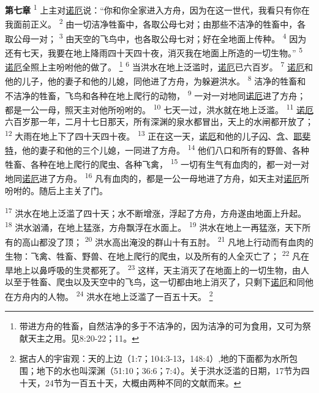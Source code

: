 \textbf{第七章\quad}
\textsuperscript{1}
上主对\uline{诺厄}说：“你和你全家进入方舟，因为在这一世代，我看只有你在我面前正义。
\textsuperscript{2}
由一切洁净牲畜中，各取公母七对；由那些不洁净的牲畜中，各取公母一对；
\textsuperscript{3}
由天空的飞鸟中，也各取公母七对；好在全地面上传种。
\textsuperscript{4}
因为还有七天，我要在地上降雨四十天四十夜，消灭我在地面上所造的一切生物。”
\textsuperscript{5}
\uline{诺厄}全照上主吩咐他的做了。
\footnote{带进方舟的牲畜，自然洁净的多于不洁净的，因为洁净的可为食用，又可为祭献天主之用。见8:20-22；11。}
\textsuperscript{6}
当洪水在地上泛滥时，\uline{诺厄}已六百岁。
\textsuperscript{7}
\uline{诺厄}和他的儿子，他的妻子和他的儿媳，同他进了方舟，为躲避洪水。
\textsuperscript{8}
洁净的牲畜和不洁净的牲畜，飞鸟和各种在地上爬行的动物，
\textsuperscript{9}
一对一对地同\uline{诺厄}进了方舟；都是一公一母，照天主对他所吩咐的。
\textsuperscript{10}
七天一过，洪水就在地上泛滥。
\textsuperscript{11}
\uline{诺厄}六百岁那一年，二月十七日那天，所有深渊的泉水都冒出，天上的水闸都开放了；
\textsuperscript{12}
大雨在地上下了四十天四十夜。
\textsuperscript{13}
正在这一天，\uline{诺厄}和他的儿子\uline{闪}、\uline{含}、\uline{耶斐特}，他的妻子和他的三个儿媳，一同进了方舟。
\textsuperscript{14}
他们八口和所有的野兽、各种牲畜、各种在地上爬行的爬虫、各种飞禽，
\textsuperscript{15}
一切有生气有血肉的，都一对一对地同\uline{诺厄}进了方舟。
\textsuperscript{16}
凡有血肉的，都是一公一母地进了方舟，如天主对\uline{诺厄}所吩咐的。随后上主关了门。

\textsuperscript{17}
洪水在地上泛滥了四十天；水不断增涨，浮起了方舟，方舟遂由地面上升起。
\textsuperscript{18}
洪水汹涌，在地上猛涨，方舟飘浮在水面上。
\textsuperscript{19}
洪水在地上一再猛涨，天下所有的高山都没了顶；
\textsuperscript{20}
洪水高出淹没的群山十有五肘。
\textsuperscript{21}
凡地上行动而有血肉的生物：飞禽、牲畜、野兽、在地上爬行的爬虫，以及所有的人全灭亡了；
\textsuperscript{22}
凡在旱地上以鼻呼吸的生灵都死了。
\textsuperscript{23}
这样，天主消灭了在地面上的一切生物，由人以至于牲畜、爬虫以及天空中的飞鸟，这一切都由地上消灭了，只剩下\uline{诺厄}和同他在方舟内的人物。
\textsuperscript{24}
洪水在地上泛滥了一百五十天。
\footnote{据古人的宇宙观：天的上边（1:7；104:3-13，148:4）,地的下面都为水所包围；地下的水也叫深渊（51:10；36:6；7:4）。关于洪水泛滥的日期，17节为四十天，24节为一百五十天，大概由两种不同的文献而来。}

